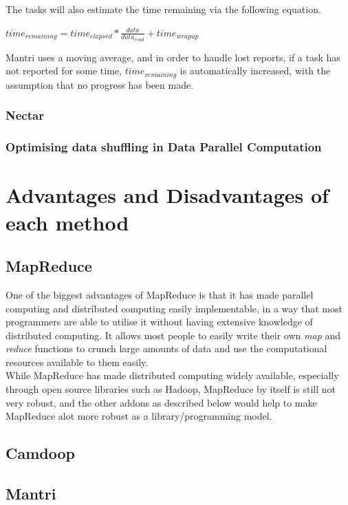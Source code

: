 \documentclass[]{article}
\begin{document}
The tasks will also estimate the time remaining via the following equation. 

$time_{remaining} = time_{elapsed} * \frac{data}{data_{read}} + time_{wrapup}$

Mantri uses a moving average, and in order to handle lost reports, if a task has not reported for some time, $time_{remaining}$ is automatically increased, with the assumption that no progress has been made.\\

\subsubsection{Nectar}

\subsubsection{Optimising data shuffling in Data Parallel Computation}

\section{Advantages and Disadvantages of each method}
\subsection{MapReduce}
One of the biggest advantages of MapReduce is that it has made parallel computing and distributed computing easily implementable, in a way that most programmers are able to utilise it without having extensive knowledge of distributed computing. It allows most people to easily write their own \emph{map} and \emph{reduce} functions to crunch large amounts of data and use the computational resources available to them easily. \\

While MapReduce has made distributed computing widely available, especially through open source libraries such as Hadoop, MapReduce by itself is still not very robust, and the other addons as described below would help to make MapReduce alot more robust as a library/programming model.

\subsection{Camdoop}

\subsection{Mantri}
\end{document}
